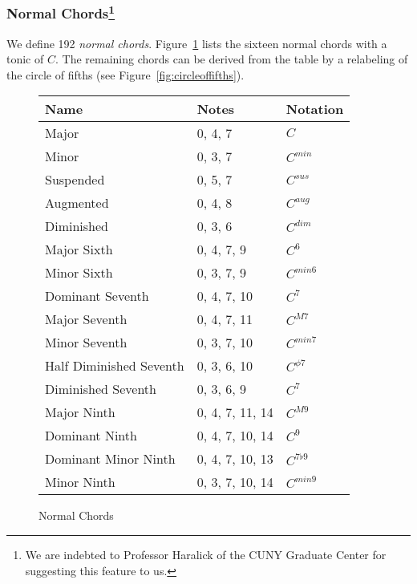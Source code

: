 \documentclass[twocolumn,dvipsnames]{article}
\begin{document}
\subsubsection{Normal Chords\protect\footnote{We are indebted to Professor Haralick of the CUNY Graduate Center for suggesting this feature to us.}}\label{sec:chordgraph}
We define 192 \textit{normal chords}.
Figure~\ref{tab:chords} lists the sixteen normal chords with a tonic of $C$.
The remaining chords can be derived from the table by a relabeling of the circle of fifths (see Figure~\ref{fig:circleoffifths}).
\begin{figure}[h!]
\small
\begin{tabular}{lll}
\toprule
Name & Notes & Notation \\
\midrule
Major                   & 0, 4, 7         & $C$             \\
Minor                   & 0, 3, 7         & $C^{min}$       \\
Suspended               & 0, 5, 7         & $C^{sus}$       \\
Augmented               & 0, 4, 8         & $C^{aug}$       \\
Diminished              & 0, 3, 6         & $C^{dim}$       \\
Major Sixth             & 0, 4, 7, 9      & $C^{6}$         \\
Minor Sixth             & 0, 3, 7, 9      & $C^{min 6}$     \\
Dominant Seventh        & 0, 4, 7, 10     & $C^{7}$         \\
Major Seventh           & 0, 4, 7, 11     & $C^{M7}$        \\
Minor Seventh           & 0, 3, 7, 10     & $C^{min 7}$     \\
Half Diminished Seventh & 0, 3, 6, 10     & $C^{\phi 7}$    \\
Diminished Seventh      & 0, 3, 6, 9      & $C^{7}$         \\
Major Ninth             & 0, 4, 7, 11, 14 & $C^{M9}$        \\
Dominant Ninth          & 0, 4, 7, 10, 14 & $C^{9}$         \\
Dominant Minor Ninth    & 0, 4, 7, 10, 13 & $C^{7 \flat 9}$ \\
Minor Ninth             & 0, 3, 7, 10, 14 & $C^{min 9}$     \\
\bottomrule
\end{tabular}
\caption{Normal Chords}\label{tab:chords}
\end{figure}
\end{document}
